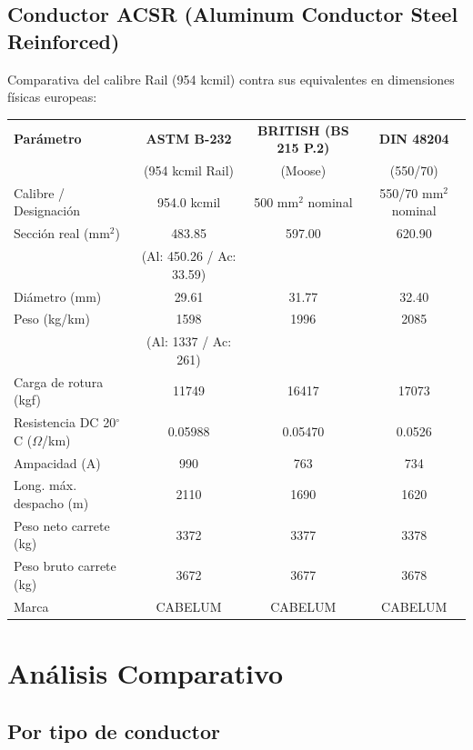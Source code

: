 \documentclass[12pt,a4paper]{article}
\begin{document}
\begin{landscape}
\subsection{Conductor ACSR (Aluminum Conductor Steel Reinforced)}

Comparativa del calibre Rail (954 kcmil) contra sus equivalentes en
dimensiones físicas europeas:
\begin{center}
\begin{tabular}{p{4cm}c|c|c}
\toprule
\textbf{Parámetro} & \textbf{ASTM B-232} & \textbf{BRITISH (BS 215 P.2)} & \textbf{DIN 48204} \\
& (954 kcmil Rail) & (Moose) & (550/70) \\
\midrule
Calibre / Designación & 954.0 kcmil & 500 mm$^2$ nominal & 550/70 mm$^2$ nominal \\
\midrule
Sección real (mm$^2$) & 483.85 & 597.00 & 620.90 \\
& (Al: 450.26 / Ac: 33.59) & & \\
\midrule
Diámetro (mm) & 29.61 & 31.77 & 32.40 \\
\midrule
Peso (kg/km) & 1598 & 1996 & 2085 \\
& (Al: 1337 / Ac: 261) & & \\
\midrule
Carga de rotura (kgf) & 11749 & 16417 & 17073 \\
\midrule
Resistencia DC 20$^\circ$C ($\Omega$/km) & 0.05988 & 0.05470 & 0.0526 \\
\midrule
Ampacidad (A) & 990 & 763 & 734 \\
\midrule
Long. máx. despacho (m) & 2110 & 1690 & 1620 \\
\midrule
Peso neto carrete (kg) & 3372 & 3377 & 3378 \\
\midrule
Peso bruto carrete (kg) & 3672 & 3677 & 3678 \\
\midrule
Marca & CABELUM & CABELUM & CABELUM \\
\bottomrule
\end{tabular}
\end{center}
\end{landscape}

\section{Análisis Comparativo}

\subsection{Por tipo de conductor}
\end{document}
